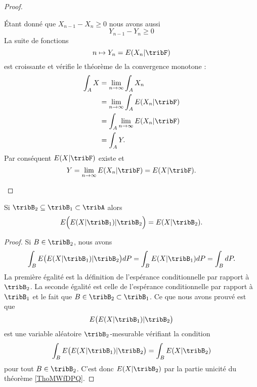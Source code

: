 \begin{proof}
\begin{description}
            Étant donné que \( X_{n-1}-X_n\geq 0\) nous avons aussi
            \begin{equation}
                Y_{n-1}-Y_{n}\geq 0
            \end{equation}
            La suite de fonctions
            \begin{equation}
                n\mapsto Y_n=E(X_n|\tribF)
            \end{equation}
            est croissante et vérifie le théorème de la convergence monotone :
            \begin{subequations}
                \begin{align}
                    \int_A X&=\lim_{n\to \infty} \int_A X_n\\
                    &=\lim_{n\to \infty} \int_A E(X_n|\tribF)\\
                    &=\int_A\lim_{n\to \infty } E(X_n|\tribF)\\
                    &=\int_A Y.
                \end{align}
            \end{subequations}
            Par conséquent \( E(X|\tribF)\) existe et
            \begin{equation}
                Y=\lim_{n\to \infty} E(X_n|\tribF)=E(X|\tribF).
            \end{equation}
    \end{description}
\end{proof}

\begin{proposition}     \label{PropRGcscXj}
    Si \( \tribB_2\subseteq\tribB_1\subset\tribA\) alors
    \begin{equation}
        E\Big( E(X|\tribB_1)|\tribB_2 \Big)=E(X|\tribB_2).
    \end{equation}
\end{proposition}

\begin{proof}
    Si \( B\in\tribB_2\), nous avons
    \begin{equation}
        \int_BE\big( E(X|\tribB_1)|\tribB_2 \big)dP=\int_B E(X|\tribB_1)dP=\int_BdP.
    \end{equation}
    La première égalité est la définition de l'espérance conditionnelle par rapport à \( \tribB_2\). La seconde égalité est celle de l'espérance conditionnelle par rapport à \( \tribB_1\) et le fait que \( B\in\tribB_2\subset\tribB_1\). Ce que nous avons prouvé est que
    \begin{equation}
        E\big( E(X|\tribB_1)|\tribB_2 \big)
    \end{equation}
    est une variable aléatoire \( \tribB_2\)-mesurable vérifiant la condition
    \begin{equation}
        \int_BE\big( E(X|\tribB_1)|\tribB_2 \big)=\int_BE(X|\tribB_2)
    \end{equation}
    pour tout \( B\in \tribB_2\). C'est donc \( E(X|\tribB_2)\) par la partie unicité du théorème \ref{ThoMWfDPQ}.
\end{proof}

